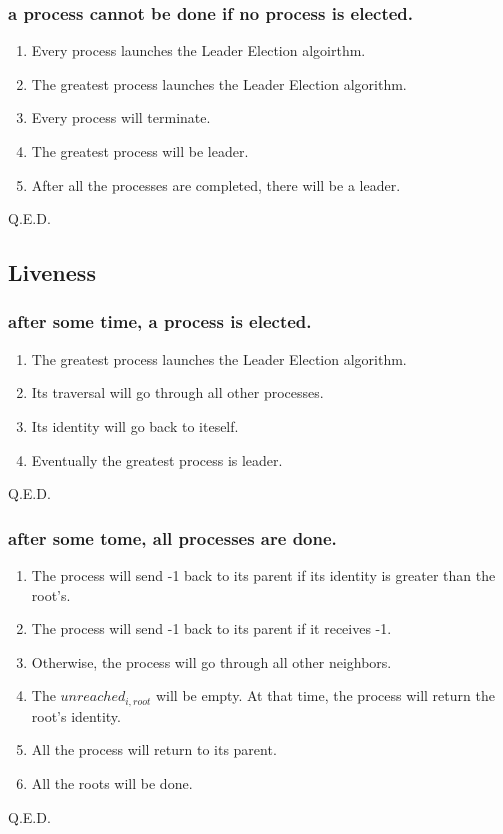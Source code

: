 \documentclass{article}
\begin{document}
\subsubsection{a process cannot be done if no process is elected.}
\begin{enumerate}
  \item Every process launches the Leader Election algoirthm.
  \item The greatest process launches the Leader Election algorithm.
  \item Every process will terminate.
  \item The greatest process will be leader.
  \item After all the processes are completed, there will be a leader.
\end{enumerate}
Q.E.D.

\subsection{Liveness}

\subsubsection{after some time, a process is elected.}
\begin{enumerate}
  \item The greatest process launches the Leader Election algorithm.
  \item Its traversal will go through all other processes.
  \item Its identity will go back to iteself.
  \item Eventually the greatest process is leader.
\end{enumerate}
Q.E.D.

\subsubsection{after some tome, all processes are done.}
\begin{enumerate}
  \item The process will send -1 back to its parent if its identity is greater than the root's.
  \item The process will send -1 back to its parent if it receives -1.
  \item Otherwise, the process will go through all other neighbors.
  \item The $unreached_{i,root}$ will be empty. At that time, the process will return the root's identity.
  \item All the process will return to its parent.
  \item All the roots will be done.
\end{enumerate}
Q.E.D.
\end{document}
